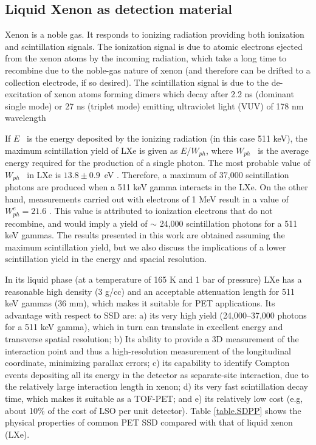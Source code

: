 \subsection{Liquid Xenon as detection material}

%

Xenon is a noble gas. It responds to ionizing radiation providing both ionization and scintillation signals. The ionization signal is due to atomic electrons ejected from the xenon atoms by the incoming radiation, which take a long time to recombine due to the noble-gas nature of xenon (and therefore can be drifted to a collection electrode, if so desired). The scintillation signal is due to the de-excitation of xenon atoms forming dimers which decay after 2.2 ns (dominant single mode) or 27 ns (triplet mode) emitting ultraviolet light (VUV) of 178 nm wavelength %

If $E$~ is the energy deposited by the ionizing radiation (in this case 511 keV), the maximum scintillation yield of LXe is given as $E/W_{ph}$, where $W_{ph}$~ is the average energy required for the production of a single photon. The most probable value of $W_{ph}$~ in LXe  is  $13.8 \pm 0.9$~eV \cite{aprile10}. Therefore, a maximum of 37,000 scintillation photons are produced when a 511 keV gamma interacts in the LXe. On the other hand, measurements carried out with electrons of 1 MeV result in a value of $W_{ph}^e = 21.6$ \cite{doke02}. This value is attributed to ionization electrons that do not recombine, and would imply a yield of $\sim$ 24,000 scintillation photons for a 511 keV gammas. The results presented in this work are obtained assuming the maximum scintillation yield, but we also discuss the implications of a lower scintillation yield in the energy and spacial resolution. 

In its liquid phase (at a temperature of 165 K and 1 bar of pressure) LXe has a reasonable high density (3 g/cc) and an acceptable attenuation length for 511 keV gammas (36 mm), which makes it suitable for PET applications. Its advantage with respect to SSD are: a) its very high yield (24,000--37,000 photons for a 511 keV gamma), which in turn can translate in excellent energy and transverse spatial resolution; b) Its ability to provide a 3D measurement of the interaction point and thus a high-resolution measurement of the longitudinal coordinate, minimizing parallax errors; c) its capability to identify Compton events depositing all its energy in the detector as separate-site interaction, due to the relatively large interaction length in xenon;  d) its very fast scintillation decay time, which makes it suitable as a TOF-PET;  and e) its relatively low cost (e.g, about 10\% of the cost of LSO per unit detector).  Table \ref{table.SDPP} shows the physical properties of common PET SSD compared with that of liquid xenon (LXe). 


